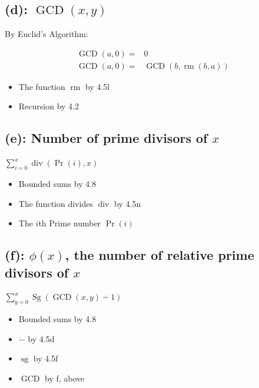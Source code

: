 \documentclass[fleqn]{article}
\begin{document}
\subsection*{(d): $\operatorname{GCD}(x, y)$}

By Euclid's Algorithm:

\begin{align*}
\operatorname{GCD}(a, 0) =& 0 \\
\operatorname{GCD}(a, 0) =& \operatorname{GCD}(b, \operatorname{rm}(b, a))
\end{align*}

\begin{itemize}
\item The function $\operatorname{rm}$ by 4.5l
\item Recursion by 4.2
\end{itemize}

\subsection*{(e): Number of prime divisors of $x$}

$\sum_{i=0}^{x}\operatorname{div}(\operatorname{Pr}(i), x)$

\begin{itemize}
\item Bounded sums by 4.8
\item The function divides $\operatorname{div}$ by 4.5n
\item The $i$th Prime number $\operatorname{Pr}(i)$ 
\end{itemize}


\subsection*{(f): $\phi(x)$, the number of relative prime divisors of $x$}

$\sum_{y=0}^x\operatorname{Sg}(\operatorname{GCD}(x, y) \dotminus 1)$

\begin{itemize}
\item Bounded sums by 4.8
\item $\dot{-}$ by 4.5d
\item $\operatorname{sg}$ by 4.5f
\item $\operatorname{GCD}$ by f, above
\end{itemize}
\end{document}
